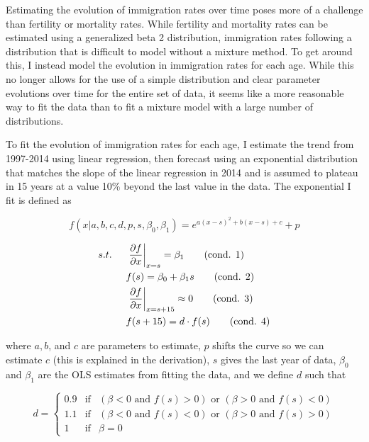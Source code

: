\documentclass[10pt]{article}
\numberwithin{equation}{subsection}
\begin{document}
\par Estimating the evolution of immigration rates over time poses more of a challenge than fertility or mortality rates. While fertility and mortality rates can be estimated using a generalized beta 2 distribution, immigration rates following a distribution that is difficult to model without a mixture method. To get around this, I instead model the evolution in immigration rates for each age. While this no longer allows for the use of a simple distribution and clear parameter evolutions over time for the entire set of data, it seems like a more reasonable way to fit the data than to fit a mixture model with a large number of distributions.

\par To fit the evolution of immigration rates for each age, I estimate the trend from 1997-2014 using linear regression, then forecast using an exponential distribution that matches the slope of the linear regression in 2014 and is assumed to plateau in 15 years at a value 10\% beyond the last value in the data. The exponential I fit is defined as

\begin{equation}
   f(x|a, b, c, d, p, s, \beta_0, \beta_1) = e^{a(x-s)^2 + b(x-s) + c} + p
\end{equation}

\begin{align*}
   s.t. \hspace{5mm} &\left.\pdv{f}{x}\right|_{x=s} = \beta_1 \tag{cond. 1} \label{c1} \\
   &f(s) = \beta_0 + \beta_1 s \tag{cond. 2} \label{c2} \\
   &\left.\pdv{f}{x}\right|_{x=s + 15} \approx 0 \tag{cond. 3} \label{c3} \\
   &f(s + 15) = d \cdot f(s) \tag{cond. 4} \label{c4}
\end{align*}

\par where \(a, b\), and \(c\) are parameters to estimate, \(p\) shifts the curve so we can estimate \(c\) (this is explained in the derivation), \(s\) gives the last year of data, \(\beta_0\) and \(\beta_1\) are the OLS estimates from fitting the data, and we define \(d\) such that

\[
   d = \left\{\begin{matrix}
      0.9 & \text{if} & (\beta < 0 \text{ and } f(s) > 0) \text{ or } (\beta > 0 \text{ and } f(s) < 0) \\
      1.1 & \text{if} & (\beta < 0 \text{ and } f(s) < 0) \text{ or } (\beta > 0 \text{ and } f(s) > 0) \\
      1 & \text{if} & \beta = 0
   \end{matrix}\right.
\]
\end{document}
